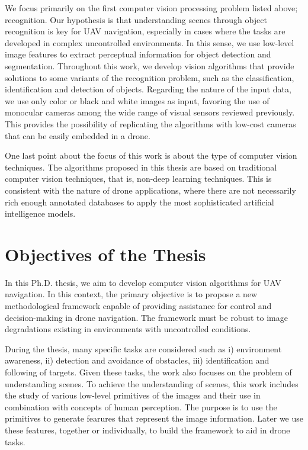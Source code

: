 We focus primarily on the first computer vision processing problem listed above; recognition. Our hypothesis is that understanding scenes through object recognition is key for UAV navigation, especially in cases where the tasks are developed in complex uncontrolled environments. In this sense, we use low-level image features to extract perceptual information for object detection and segmentation. Throughout this work, we develop vision algorithms that provide solutions to some variants of the recognition problem, such as the classification, identification and detection of objects. Regarding the nature of the input data, we use only color or black and white images as input, favoring the use of monocular cameras among the wide range of visual sensors reviewed previously. This provides the possibility of replicating the algorithms with low-cost cameras that can be easily embedded in a drone.

One last point about the focus of this work is about the type of computer vision techniques. The algorithms proposed in this thesis are based on traditional computer vision techniques, that is, non-deep learning techniques. This is consistent with the nature of drone applications, where there are not necessarily rich enough annotated databases to apply the most sophisticated artificial intelligence models.

\section*{Objectives of the Thesis}\label{sec:objectives_of_the_thesis}

In this Ph.D. thesis, we aim to develop computer vision algorithms for UAV navigation. In this context, the primary objective is to propose a new methodological framework capable of providing assistance for control and decision-making in drone navigation. The framework must be robust to image degradations existing in environments with uncontrolled conditions.

During the thesis, many specific tasks are considered such as i) environment awareness, ii) detection and avoidance of obstacles, iii) identification and following of targets. Given these tasks, the work also focuses on the problem of understanding scenes. To achieve the understanding of scenes, this work includes the study of various low-level primitives of the images and their use in combination with concepts of human perception. The purpose is to use the primitives to generate fearures that represent the image information. Later we use these features, together or individually, to build the framework to aid in drone tasks.

